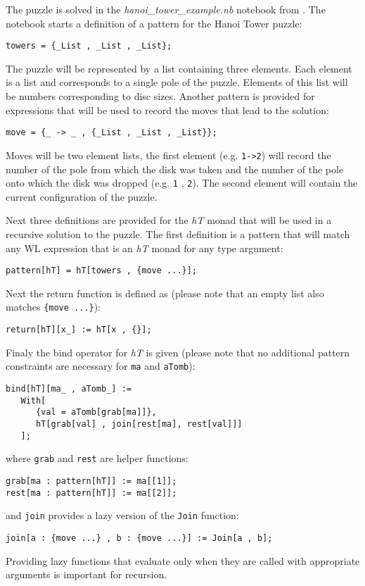 \documentclass[smallextended]{svjour3}
\begin{document}
The puzzle is solved in the \emph{hanoi\_tower\_example.nb} notebook from \cite{repos}.
The notebook starts a definition 
of a pattern for the Hanoi Tower puzzle:
\begin{lstlisting}
towers = {_List , _List , _List};
\end{lstlisting}
The puzzle will be represented by a list containing three elements. Each 
element is a list and corresponds to a single pole of the puzzle.
Elements of this list will be numbers corresponding to disc sizes. 
Another pattern is provided for expressions that will be used to record
the moves that lead to the solution:
\begin{lstlisting}
move = {_ -> _ , {_List , _List , _List}};
\end{lstlisting}
Moves will be two element lists, the first element (e.g. \verb|1->2|)
will record the number of the pole from which the disk was taken and the number
of the pole onto which the disk was dropped (e.g. \verb|1| , \verb|2|). The
second element will contain the current configuration of the puzzle.

Next three definitions are provided for the \emph{hT} monad that will be used in
a recursive solution to the puzzle. The first definition is a pattern that will match any
WL expression that is an \emph{hT} monad for any type argument:
\begin{lstlisting}
pattern[hT] = hT[towers , {move ...}];
\end{lstlisting}
Next the return function is defined as (please note that an empty list also matches \verb|{move ...}|):
\begin{lstlisting}
return[hT][x_] := hT[x , {}];
\end{lstlisting}
Finaly the bind
operator for \emph{hT} is given (please note that no additional pattern
constraints are necessary for \verb|ma| and \verb|aTomb|):
\begin{lstlisting}
bind[hT][ma_ , aTomb_] := 
   With[
      {val = aTomb[grab[ma]]}, 
      hT[grab[val] , join[rest[ma], rest[val]]]
   ];
\end{lstlisting}
where \verb|grab| and \verb|rest| are helper functions:
\begin{lstlisting}
grab[ma : pattern[hT]] := ma[[1]];
rest[ma : pattern[hT]] := ma[[2]];
\end{lstlisting}
and \verb|join| provides a lazy version of the \verb|Join| function:
\begin{lstlisting}
join[a : {move ...} , b : {move ...}] := Join[a , b];
\end{lstlisting}
Providing lazy functions that evaluate only when they are called with 
appropriate arguments is important for recursion.
\end{document}
